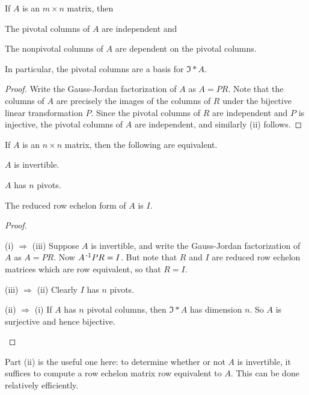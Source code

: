 \documentclass{memoir}
\begin{document}
\begin{prp}
If $A$ is an $m \times n$ matrix, then
\begin{enumerate*}
\item The pivotal columns of $A$ are independent and
\item The nonpivotal columns of $A$ are dependent on the pivotal columns.
\end{enumerate*}
In particular, the pivotal columns are a basis for $\Im*{A}$.
\end{prp}

\begin{proof}
Write the Gauss-Jordan factorization of $A$ as $A = PR$. Note that the columns of $A$ are precisely the images of the columns of $R$ under the bijective linear transformation $P$. Since the pivotal columns of $R$ are independent and $P$ is injective, the pivotal columns of $A$ are independent, and similarly (ii) follows.
\end{proof}

\begin{prp}
If $A$ is an $n \times n$ matrix, then the following are equivalent.
\begin{enumerate*}
\item $A$ is invertible.
\item $A$ has $n$ pivots.
\item The reduced row echelon form of $A$ is $I$.
\end{enumerate*}
\end{prp}

\begin{proof} \mbox{}
\begin{enumerate*}
\item[(i) $\Rightarrow$ (iii)] Suppose $A$ is invertible, and write the Gauss-Jordan factorization of $A$ as $A = PR$. Now $A^{{\,\text{-}1}} P R = I$. But note that $R$ and $I$ are reduced row echelon matrices which are row equivalent, so that $R = I$.

\item[(iii) $\Rightarrow$ (ii)] Clearly $I$ has $n$ pivots.

\item[(ii) $\Rightarrow$ (i)] If $A$ has $n$ pivotal columns, then $\Im*{A}$ has dimension $n$. So $A$ is surjective and hence bijective. \qedhere
\end{enumerate*}
\end{proof}

Part (ii) is the useful one here: to determine whether or not $A$ is invertible, it suffices to compute a row echelon matrix row equivalent to $A$. This can be done relatively efficiently.
\end{document}
